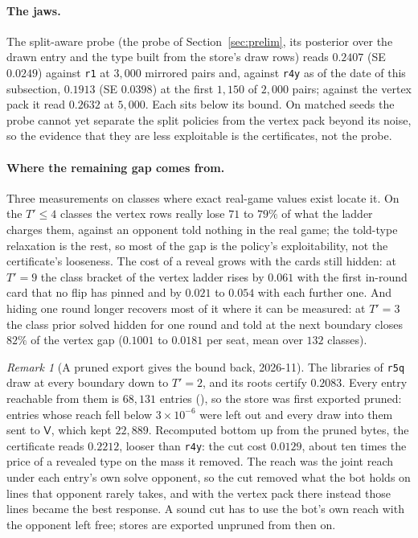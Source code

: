 \documentclass[11pt]{article}
\theoremstyle{plain}
\theoremstyle{definition}
\theoremstyle{remark}
\newtheorem{remark}[theorem]{Remark}
\newcommand{\code}[1]{\texttt{\small #1}}
\begin{document}
\paragraph{The jaws.} The split-aware probe (the probe of
Section~\ref{sec:prelim}, its posterior over the drawn entry and the
type built from the store's draw rows) reads $0.2407$ (SE $0.0249$)
against \code{r1} at $3{,}000$ mirrored pairs and, against \code{r4y}
as of the date of this subsection, $0.1913$ (SE $0.0398$) at the first
$1{,}150$ of $2{,}000$ pairs; against the vertex pack it read $0.2632$
at $5{,}000$. Each sits below its bound. On matched seeds the probe
cannot yet separate the split policies from the vertex pack beyond its
noise, so the evidence that they are less exploitable is the
certificates, not the probe.

\paragraph{Where the remaining gap comes from.} Three measurements on
classes where exact real-game values exist locate it. On the $T'\le4$
classes the vertex rows really lose $71$ to $79\%$ of what the ladder
charges them, against an opponent told nothing in the real game; the
told-type relaxation is the rest, so most of the gap is the policy's
exploitability, not the certificate's looseness. The cost of a reveal
grows with the cards still hidden: at $T'=9$ the class bracket of the
vertex ladder rises by $0.061$ with the first in-round card that no
flip has pinned and by $0.021$ to $0.054$ with each further one. And
hiding one round longer recovers most of it where it can be measured:
at $T'=3$ the class prior solved hidden for one round and told at the
next boundary closes $82\%$ of the vertex gap ($0.1001$ to $0.0181$
per seat, mean over $132$ classes).

\begin{remark}[A pruned export gives the bound back, 2026-11]
\label{rem:prunedexport}
The libraries of \code{r5q} draw at every boundary down to $T'=2$, and
its roots certify $0.2083$. Every entry reachable from them is
$68{,}131$ entries (), so the store
was first exported pruned: entries whose reach fell below $3\times
10^{-6}$ were left out and every draw into them sent to $\mathsf{V}$,
which kept $22{,}889$. Recomputed bottom up from the pruned bytes, the
certificate reads $0.2212$, looser than \code{r4y}: the cut cost
$0.0129$, about ten times the price of a revealed type on the mass it
removed. The reach was the joint reach under each entry's own solve
opponent, so the cut removed what the bot holds on lines that opponent
rarely takes, and with the vertex pack there instead those lines became
the best response. A sound cut has to use the bot's own reach with the
opponent left free; stores are exported unpruned from then on.
\end{remark}
\end{document}
